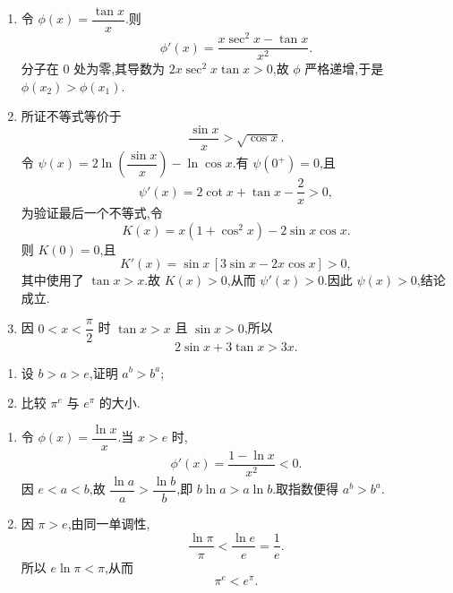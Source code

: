 \begin{solution}
    \leavevmode
    \begin{enumerate}
        \item 令 $\phi(x)=\dfrac{\tan x}{x}$.则
              \[
                  \phi'(x)=\dfrac{x\sec^2x-\tan x}{x^2}.
              \]
              分子在 $0$ 处为零,其导数为 $2x\sec^2x\tan x>0$,故 $\phi$ 严格递增,于是 $\phi(x_2)>\phi(x_1)$.

        \item 所证不等式等价于
              \[
                  \dfrac{\sin x}{x}>\sqrt{\cos x}.
              \]
              令 $\psi(x)=2\ln\left(\dfrac{\sin x}{x}\right)-\ln\cos x$.有 $\psi(0^+)=0$,且
              \[
                  \psi'(x)=2\cot x+\tan x-\dfrac{2}{x}>0,
              \]
              为验证最后一个不等式,令
              \[
                  K(x)=x(1+\cos^2x)-2\sin x\cos x.
              \]
              则 $K(0)=0$,且
              \[
                  K'(x)=\sin x\,[3\sin x-2x\cos x]>0,
              \]
              其中使用了 $\tan x>x$.故 $K(x)>0$,从而 $\psi'(x)>0$.因此 $\psi(x)>0$,结论成立.

        \item 因 $0<x<\dfrac{\pi}{2}$ 时 $\tan x>x$ 且 $\sin x>0$,所以
              \[
                  2\sin x+3\tan x>3x.
              \]
    \end{enumerate}
\end{solution}

\begin{example}
    \begin{enumerate}
        \item 设 $b>a>e$,证明 $a^b>b^a$;
        \item 比较 $\pi^e$ 与 $e^\pi$ 的大小.
    \end{enumerate}
\end{example}
\exampleblank

\begin{solution}
    \leavevmode
    \begin{enumerate}
        \item 令 $\phi(x)=\dfrac{\ln x}{x}$.当 $x>e$ 时,
              \[
                  \phi'(x)=\dfrac{1-\ln x}{x^2}<0.
              \]
              因 $e<a<b$,故 $\dfrac{\ln a}{a}>\dfrac{\ln b}{b}$,即 $b\ln a>a\ln b$.取指数便得 $a^b>b^a$.

        \item 因 $\pi>e$,由同一单调性,
              \[
                  \dfrac{\ln\pi}{\pi}<\dfrac{\ln e}{e}=\dfrac{1}{e}.
              \]
              所以 $e\ln\pi<\pi$,从而
              \[
                  \boxed{\pi^e<e^\pi}.
              \]
    \end{enumerate}
\end{solution}



